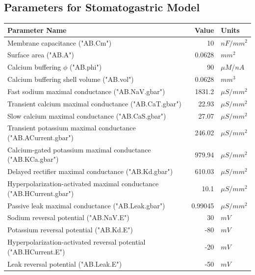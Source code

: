 \documentclass[utf8]{frontiers_suppmat} %
\begin{document}
	\subsection{Parameters for Stomatogastric Model}
	
		\begin{center}
			\begin{tabular}{|l|r|l|}
				\hline 
				\textbf{Parameter Name} & \textbf{Value} & \textbf{Units} \\ 
				\hline 
				Membrane capacitance ("AB.Cm") & 10 & ${nF}/{mm^2}$ \\ 
				\hline 
				Surface area ("AB.A") & 0.0628 & $mm^2$ \\
				\hline
				Calcium buffering $\phi$ ("AB.phi") & 90 & $\mu M / nA$ \\
				\hline
				Calcium buffering shell volume ("AB.vol") & 0.0628 & $mm^3$ \\
				\hline 
				Fast sodium maximal conductance ("AB.NaV.gbar") & 1831.2 & $\mu S/mm^2$ \\ 
				\hline
				Transient calcium maximal conductance ("AB.CaT.gbar") & 22.93 & $\mu S/mm^2$ \\ 
				\hline 
				Slow calcium maximal conductance ("AB.CaS.gbar") & 27.07 & $\mu S/mm^2$ \\ 
				\hline 
				Transient potassium maximal conductance ("AB.ACurrent.gbar") & 246.02 & $\mu S/mm^2$ \\ 
				\hline 
				Calcium-gated potassium maximal conductance ("AB.KCa.gbar") & 979.94 & $\mu S/mm^2$ \\ 
				\hline 
				Delayed rectifier maximal conductance ("AB.Kd.gbar") & 610.03 & $\mu S/mm^2$ \\ 
				\hline
				Hyperpolarization-activated maximal conductance ("AB.HCurrent.gbar") & 10.1 & $\mu S/mm^2$ \\ 
				\hline 
				Passive leak maximal conductance ("AB.Leak.gbar") & 0.99045 & $\mu S/mm^2$ \\ 
				\hline 
				Sodium reversal potential ("AB.NaV.E") & 30 & $mV$ \\ 
				\hline 
				Potassium reversal potential ("AB.Kd.E") & -80 & $mV$ \\ 
				\hline
				Hyperpolarization-activated reversal potential ("AB.HCurrent.E") & -20 & $mV$ \\
				\hline
				Leak reversal potential ("AB.Leak.E") & -50 & $mV$ \\
				\hline
			\end{tabular} 
		\end{center}
\end{document}
